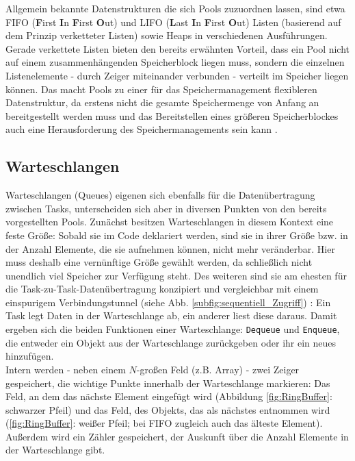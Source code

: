 \documentclass{llncs}
\begin{document}
Allgemein bekannte Datenstrukturen die sich Pools zuzuordnen lassen, sind etwa FIFO (\textbf{F}irst \textbf{I}n \textbf{F}irst \textbf{O}ut) und LIFO (\textbf{L}ast \textbf{I}n \textbf{F}irst \textbf{O}ut) Listen (basierend auf dem Prinzip verketteter Listen) sowie Heaps in verschiedenen Ausführungen. Gerade verkettete Listen bieten den bereits erwähnten Vorteil, dass ein Pool nicht auf einem zusammenhängenden Speicherblock liegen muss, sondern die einzelnen Listenelemente - durch Zeiger miteinander verbunden - verteilt im Speicher liegen können. Das macht Pools zu einer für das Speichermanagement flexibleren Datenstruktur, da erstens nicht die gesamte Speichermenge von Anfang an bereitgestellt werden muss und das Bereitstellen eines größeren Speicherblockes auch eine Herausforderung des Speichermanagements sein kann \autocite[vgl.][96]{Cooling2017}.

\subsection{Warteschlangen}
\label{subsec:Warteschlange}
Warteschlangen (Queues) eigenen sich ebenfalls für die Datenübertragung zwischen Tasks, unterscheiden sich aber in diversen Punkten von den bereits vorgestellten Pools. Zunächst besitzen Warteschlangen in diesem Kontext eine feste Größe: Sobald sie im Code deklariert werden, sind sie in ihrer Größe bzw. in der Anzahl Elemente, die sie aufnehmen können, nicht mehr veränderbar. Hier muss deshalb eine vernünftige Größe gewählt werden, da schließlich nicht unendlich viel Speicher zur Verfügung steht. Des weiteren sind sie am ehesten für die Task-zu-Task-Datenübertragung konzipiert und vergleichbar mit einem einspurigem Verbindungstunnel (siehe Abb. \ref{subfig:sequentiell_Zugriff}) \autocite[vgl.][96]{Cooling2017}: Ein Task legt Daten in der Warteschlange ab, ein anderer liest diese daraus. Damit ergeben sich die beiden Funktionen einer Warteschlange: \texttt{Dequeue} und \texttt{Enqueue}, die entweder ein Objekt aus der Warteschlange zurückgeben oder ihr ein neues hinzufügen.\\

Intern werden - neben einem $N$-großen Feld (z.B. Array) - zwei Zeiger gespeichert, die wichtige Punkte innerhalb der Warteschlange markieren: Das Feld, an dem das nächste Element eingefügt wird (Abbildung \ref{fig:RingBuffer}: schwarzer Pfeil) und das Feld, des Objekts, das als nächstes entnommen wird (\ref{fig:RingBuffer}: weißer Pfeil; bei FIFO zugleich auch das älteste Element). Außerdem wird ein Zähler gespeichert, der Auskunft über die Anzahl Elemente in der Warteschlange gibt.
\end{document}
